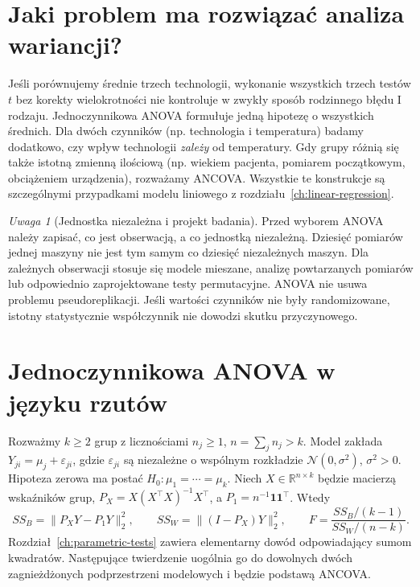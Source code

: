 \documentclass[11pt,a4paper,oneside]{report}
\numberwithin{equation}{chapter}
\theoremstyle{plain}
\theoremstyle{definition}
\theoremstyle{remark}
\newtheorem{uwaga}{Uwaga}[chapter]
\newcommand{\R}{\mathbb R}
\newcommand{\Normal}{\mathcal N}
\begin{document}
\section{Jaki problem ma rozwiązać analiza wariancji?}
Jeśli porównujemy średnie trzech technologii, wykonanie wszystkich trzech testów $t$ bez korekty wielokrotności nie kontroluje w zwykły sposób rodzinnego błędu I rodzaju. Jednoczynnikowa ANOVA formułuje jedną hipotezę o wszystkich średnich. Dla dwóch czynników (np. technologia i temperatura) badamy dodatkowo, czy wpływ technologii \emph{zależy} od temperatury. Gdy grupy różnią się także istotną zmienną ilościową (np. wiekiem pacjenta, pomiarem początkowym, obciążeniem urządzenia), rozważamy ANCOVA. Wszystkie te konstrukcje są szczególnymi przypadkami modelu liniowego z rozdziału~\ref{ch:linear-regression}.

\begin{uwaga}[Jednostka niezależna i projekt badania]
Przed wyborem ANOVA należy zapisać, co jest obserwacją, a co jednostką niezależną. Dziesięć pomiarów jednej maszyny nie jest tym samym co dziesięć niezależnych maszyn. Dla zależnych obserwacji stosuje się modele mieszane, analizę powtarzanych pomiarów lub odpowiednio zaprojektowane testy permutacyjne. ANOVA nie usuwa problemu pseudoreplikacji. Jeśli wartości czynników nie były randomizowane, istotny statystycznie współczynnik nie dowodzi skutku przyczynowego.
\end{uwaga}

\section{Jednoczynnikowa ANOVA w języku rzutów}
Rozważmy $k\ge2$ grup z licznościami $n_j\ge1$, $n=\sum_jn_j>k$. Model zakłada $Y_{ji}=\mu_j+\varepsilon_{ji}$, gdzie $\varepsilon_{ji}$ są niezależne o wspólnym rozkładzie $\Normal(0,\sigma^2)$, $\sigma^2>0$. Hipoteza zerowa ma postać $H_0:\mu_1=\cdots=\mu_k$. Niech $X\in\R^{n\times k}$ będzie macierzą wskaźników grup, $P_X=X(X^\top X)^{-1}X^\top$, a $P_1=n^{-1}\mathbf1\mathbf1^\top$. Wtedy
\[
 SS_B=\|P_XY-P_1Y\|_2^2,\qquad
 SS_W=\|(I-P_X)Y\|_2^2,\qquad
 F=\frac{SS_B/(k-1)}{SS_W/(n-k)}.
\]
Rozdział~\ref{ch:parametric-tests} zawiera elementarny dowód odpowiadający sumom kwadratów. Następujące twierdzenie uogólnia go do dowolnych dwóch zagnieżdżonych podprzestrzeni modelowych i będzie podstawą ANCOVA.
\end{document}
